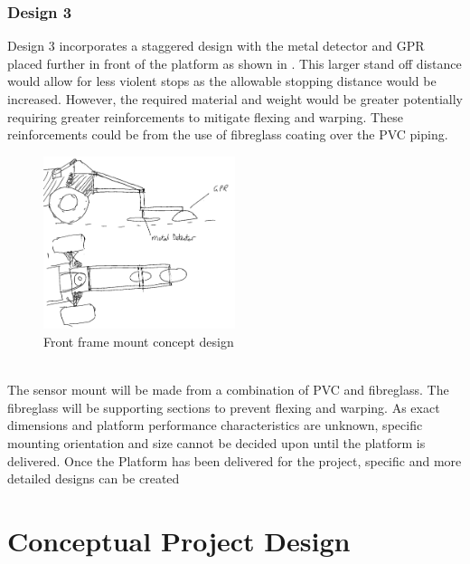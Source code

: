 \documentclass[main.tex]{subfiles}
\begin{document}
\subsubsection{Design 3}
Design 3 incorporates a staggered design with the metal detector and GPR placed further in front of the platform as shown in . This larger stand off distance would allow for less violent stops as the allowable stopping distance would be increased. However, the required material and weight would be greater potentially requiring greater reinforcements to mitigate flexing and warping. These reinforcements could be from the use of fibreglass coating over the PVC piping.
\begin{figure}[ht]
\includegraphics[width=0.5\textwidth]{4-ConceptDesign/front_mount_staggered.png}
\centering
\caption{Front frame mount concept design}
\end{figure}\\

The sensor mount will be made from a combination of PVC and fibreglass. The fibreglass will be supporting sections to prevent flexing and warping. As exact dimensions and platform performance characteristics are unknown, specific mounting orientation and size cannot be decided upon until the platform is delivered. Once the Platform has been delivered for the project, specific and more detailed designs can be created

\section{Conceptual Project Design}
\end{document}
